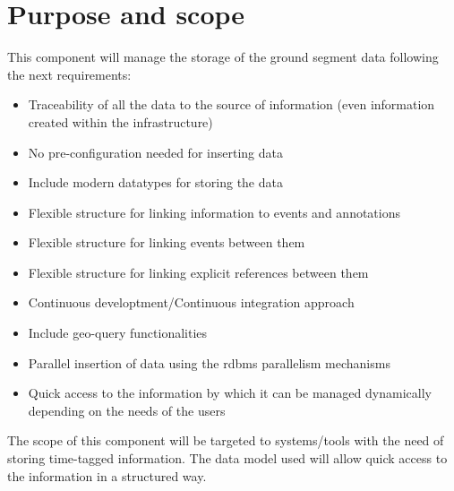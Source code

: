 \chapter{Purpose and scope}

This component will manage the storage of the ground segment data following the next requirements:

\begin{itemize} 

\item Traceability of all the data to the source of information (even information created within the infrastructure)

\item No pre-configuration needed for inserting data

\item Include modern datatypes for storing the data

\item Flexible structure for linking information to events and annotations

\item Flexible structure for linking events between them

\item Flexible structure for linking explicit references between them

\item Continuous developtment/Continuous integration approach

\item Include geo-query functionalities

\item Parallel insertion of data using the \acrshort{rdbms} parallelism mechanisms

\item Quick access to the information by which it can be managed dynamically depending on the needs of the users

\end{itemize}

The scope of this component will be targeted to systems/tools with the need of storing time-tagged information. The data model used will allow quick access to the information in a structured way.
